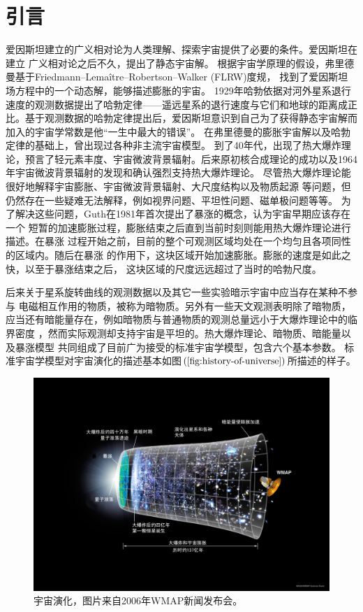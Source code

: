 \chapter{引言}%
\label{chap:introduction}

爱因斯坦建立的广义相对论为人类理解、探索宇宙提供了必要的条件。爱因斯坦在建立
广义相对论之后不久，提出了静态宇宙解。
根据宇宙学原理的假设，弗里德曼基于Friedmann–Lemaître–Robertson–Walker (FLRW)度规，
找到了爱因斯坦场方程中的一个动态解，能够描述膨胀的宇宙。
1929年哈勃依据对河外星系退行速度的观测数据提出了哈勃定律——遥远星系的退行速度与它们和地球的距离成正比。基于观测数据的哈勃定律提出后，爱因斯坦意识到自己为了获得静态宇宙解而加入的宇宙学常数是他“一生中最大的错误”。
在弗里德曼的膨胀宇宙解以及哈勃定律的基础上，曾出现过各种非主流宇宙模型。
到了40年代，出现了热大爆炸理论，预言了轻元素丰度、宇宙微波背景辐射。后来原初核合成理论的成功以及1964年宇宙微波背景辐射的发现和确认强烈支持热大爆炸理论。
尽管热大爆炸理论能很好地解释宇宙膨胀、宇宙微波背景辐射、大尺度结构以及物质起源
等问题，但仍然存在一些疑难无法解释，例如视界问题、平坦性问题、磁单极问题等等。
为了解决这些问题，Guth在1981年首次提出了暴涨的概念，认为宇宙早期应该存在一个
短暂的加速膨胀过程，膨胀结束之后直到当前时刻则能用热大爆炸理论进行描述。在暴涨
过程开始之前，目前的整个可观测区域均处在一个均匀且各项同性的区域内。随后在暴涨
的作用下，这块区域开始加速膨胀。膨胀的速度是如此之快，以至于暴涨结束之后，
这块区域的尺度远远超过了当时的哈勃尺度。

后来关于星系旋转曲线的观测数据以及其它一些实验暗示宇宙中应当存在某种不参与
电磁相互作用的物质，被称为暗物质。另外有一些天文观测表明除了暗物质，
应当还有暗能量存在，例如暗物质与普通物质的观测总量远小于大爆炸理论中的临界密度
，然而实际观测却支持宇宙是平坦的。热大爆炸理论、暗物质、暗能量以及暴涨模型
共同组成了目前广为接受的标准宇宙学模型，包含六个基本参数。
标准宇宙学模型对宇宙演化的描述基本如图$(\ref{fig:history-of-universe})$所描述的样子。

\begin{figure}[!htbp]
  \centering
  \includegraphics[width=6in]{Img/CMB_Timeline75_zh-cnversion.jpg}
  \caption{宇宙演化，图片来自2006年WMAP新闻发布会。}\label{fig:history-of-universe}
\end{figure}


